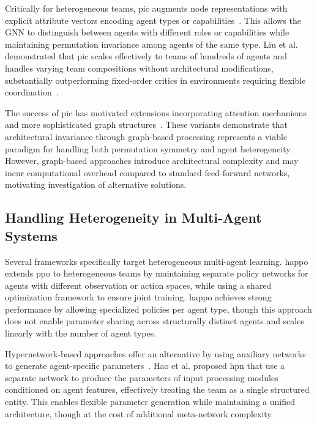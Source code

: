 \documentclass[conference]{IEEEtran}
\begin{document}
Critically for heterogeneous teams, \gls{pic} augments node representations 
with explicit attribute vectors encoding agent types or capabilities~\cite{liu2020b}. 
This allows the GNN to distinguish between agents with different roles or capabilities 
while maintaining permutation invariance among agents of the same type. 
Liu et al. demonstrated that \gls{pic} scales effectively to teams of hundreds of 
agents and handles varying team compositions without architectural modifications, 
substantially outperforming fixed-order critics in environments 
requiring flexible coordination~\cite{liu2020b}.

The success of \gls{pic} has motivated extensions incorporating attention 
mechanisms and more sophisticated graph structures~\cite{hao2023, hao2022}. 
These variants demonstrate that architectural invariance through graph-based processing 
represents a viable paradigm for handling both permutation symmetry and agent heterogeneity. 
However, graph-based approaches introduce architectural complexity and may incur 
computational overhead compared to standard feed-forward networks, 
motivating investigation of alternative solutions.

\subsection{Handling Heterogeneity in Multi-Agent Systems}

Several frameworks specifically target heterogeneous multi-agent learning. 
\Gls{happo}~\cite{zhong2024} extends \gls{ppo} to heterogeneous 
teams by maintaining separate policy networks for agents with different observation 
or action spaces, while using a shared optimization framework to ensure joint training. 
\Gls{happo} achieves strong performance by allowing specialized policies per agent type, 
though this approach does not enable parameter sharing across structurally distinct 
agents and scales linearly with the number of agent types.

Hypernetwork-based approaches offer an alternative by using auxiliary 
networks to generate agent-specific parameters~\cite{hao2023}. 
Hao et al. proposed \gls{hpn} that use a separate network to produce 
the parameters of input processing modules conditioned on agent features, 
effectively treating the team as a single structured entity. 
This enables flexible parameter generation while maintaining a unified architecture, 
though at the cost of additional meta-network complexity.
\end{document}

